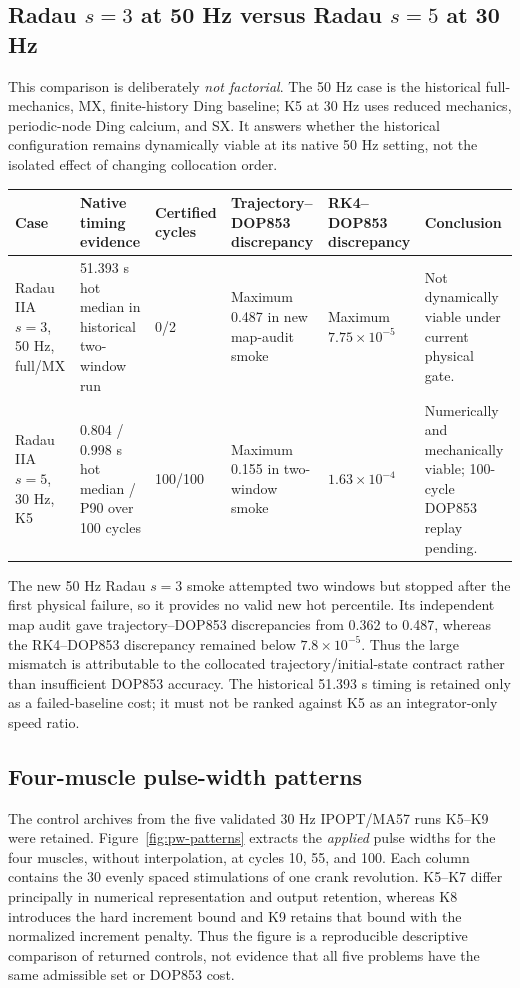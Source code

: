 \documentclass[10pt]{article}
\begin{document}
\subsection{Radau $s=3$ at 50 Hz versus Radau $s=5$ at 30 Hz}

This comparison is deliberately \emph{not factorial}. The 50 Hz case is the historical full-mechanics, MX, finite-history Ding baseline; K5 at 30 Hz uses reduced mechanics, periodic-node Ding calcium, and SX. It answers whether the historical configuration remains dynamically viable at its native 50 Hz setting, not the isolated effect of changing collocation order.

\begin{longtable}{@{}p{}p{}p{}p{}p{}p{}@{}}
\toprule
Case & Native timing evidence & Certified cycles & Trajectory--DOP853 discrepancy & RK4--DOP853 discrepancy & Conclusion\\
\midrule
\endhead
Radau IIA $s=3$, 50 Hz, full/MX & 51.393 s hot median in historical two-window run & 0/2 & Maximum 0.487 in new map-audit smoke & Maximum $7.75\times10^{-5}$ & Not dynamically viable under current physical gate.\\
Radau IIA $s=5$, 30 Hz, K5 & 0.804 / 0.998 s hot median / P90 over 100 cycles & 100/100 & Maximum 0.155 in two-window smoke & $1.63\times10^{-4}$ & Numerically and mechanically viable; 100-cycle DOP853 replay pending.\\
\bottomrule
\end{longtable}

The new 50 Hz Radau $s=3$ smoke attempted two windows but stopped after the first physical failure, so it provides no valid new hot percentile. Its independent map audit gave trajectory--DOP853 discrepancies from 0.362 to 0.487, whereas the RK4--DOP853 discrepancy remained below $7.8\times10^{-5}$. Thus the large mismatch is attributable to the collocated trajectory/initial-state contract rather than insufficient DOP853 accuracy. The historical 51.393 s timing is retained only as a failed-baseline cost; it must not be ranked against K5 as an integrator-only speed ratio.

\subsection{Four-muscle pulse-width patterns}

The control archives from the five validated 30 Hz IPOPT/MA57 runs K5--K9 were retained. Figure~\ref{fig:pw-patterns} extracts the \emph{applied} pulse widths for the four muscles, without interpolation, at cycles 10, 55, and 100. Each column contains the 30 evenly spaced stimulations of one crank revolution. K5--K7 differ principally in numerical representation and output retention, whereas K8 introduces the hard increment bound and K9 retains that bound with the normalized increment penalty. Thus the figure is a reproducible descriptive comparison of returned controls, not evidence that all five problems have the same admissible set or DOP853 cost.
\end{document}
